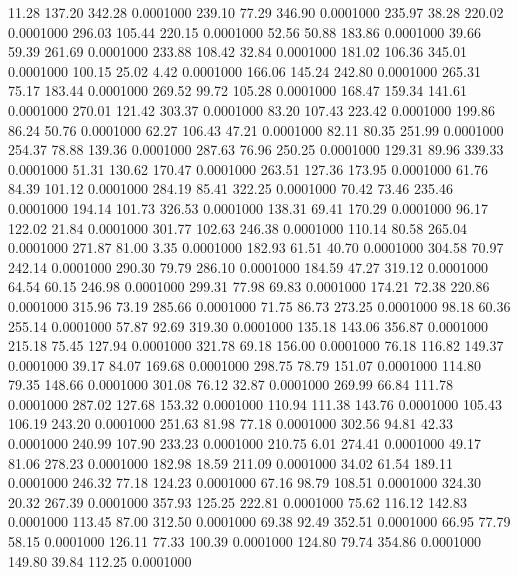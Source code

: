   11.28  137.20  342.28   0.0001000
 239.10   77.29  346.90   0.0001000
 235.97   38.28  220.02   0.0001000
 296.03  105.44  220.15   0.0001000
  52.56   50.88  183.86   0.0001000
  39.66   59.39  261.69   0.0001000
 233.88  108.42   32.84   0.0001000
 181.02  106.36  345.01   0.0001000
 100.15   25.02    4.42   0.0001000
 166.06  145.24  242.80   0.0001000
 265.31   75.17  183.44   0.0001000
 269.52   99.72  105.28   0.0001000
 168.47  159.34  141.61   0.0001000
 270.01  121.42  303.37   0.0001000
  83.20  107.43  223.42   0.0001000
 199.86   86.24   50.76   0.0001000
  62.27  106.43   47.21   0.0001000
  82.11   80.35  251.99   0.0001000
 254.37   78.88  139.36   0.0001000
 287.63   76.96  250.25   0.0001000
 129.31   89.96  339.33   0.0001000
  51.31  130.62  170.47   0.0001000
 263.51  127.36  173.95   0.0001000
  61.76   84.39  101.12   0.0001000
 284.19   85.41  322.25   0.0001000
  70.42   73.46  235.46   0.0001000
 194.14  101.73  326.53   0.0001000
 138.31   69.41  170.29   0.0001000
  96.17  122.02   21.84   0.0001000
 301.77  102.63  246.38   0.0001000
 110.14   80.58  265.04   0.0001000
 271.87   81.00    3.35   0.0001000
 182.93   61.51   40.70   0.0001000
 304.58   70.97  242.14   0.0001000
 290.30   79.79  286.10   0.0001000
 184.59   47.27  319.12   0.0001000
  64.54   60.15  246.98   0.0001000
 299.31   77.98   69.83   0.0001000
 174.21   72.38  220.86   0.0001000
 315.96   73.19  285.66   0.0001000
  71.75   86.73  273.25   0.0001000
  98.18   60.36  255.14   0.0001000
  57.87   92.69  319.30   0.0001000
 135.18  143.06  356.87   0.0001000
 215.18   75.45  127.94   0.0001000
 321.78   69.18  156.00   0.0001000
  76.18  116.82  149.37   0.0001000
  39.17   84.07  169.68   0.0001000
 298.75   78.79  151.07   0.0001000
 114.80   79.35  148.66   0.0001000
 301.08   76.12   32.87   0.0001000
 269.99   66.84  111.78   0.0001000
 287.02  127.68  153.32   0.0001000
 110.94  111.38  143.76   0.0001000
 105.43  106.19  243.20   0.0001000
 251.63   81.98   77.18   0.0001000
 302.56   94.81   42.33   0.0001000
 240.99  107.90  233.23   0.0001000
 210.75    6.01  274.41   0.0001000
  49.17   81.06  278.23   0.0001000
 182.98   18.59  211.09   0.0001000
  34.02   61.54  189.11   0.0001000
 246.32   77.18  124.23   0.0001000
  67.16   98.79  108.51   0.0001000
 324.30   20.32  267.39   0.0001000
 357.93  125.25  222.81   0.0001000
  75.62  116.12  142.83   0.0001000
 113.45   87.00  312.50   0.0001000
  69.38   92.49  352.51   0.0001000
  66.95   77.79   58.15   0.0001000
 126.11   77.33  100.39   0.0001000
 124.80   79.74  354.86   0.0001000
 149.80   39.84  112.25   0.0001000
